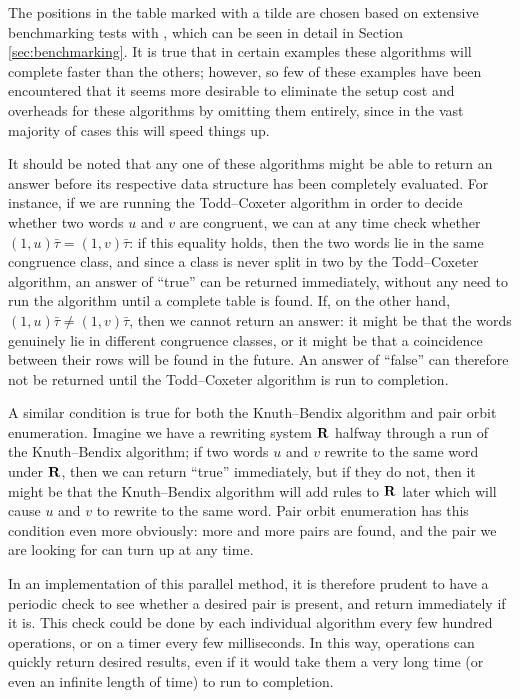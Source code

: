 The positions in the table marked with a tilde are chosen based on extensive
benchmarking tests with \libsemigroups{}, which can be seen in detail in
Section \ref{sec:benchmarking}.  It is true that in certain examples these
algorithms will complete faster than the others; however, so few of these
examples have been encountered that it seems more desirable to eliminate the
setup cost and overheads for these algorithms by omitting them entirely, since
in the vast majority of cases this will speed things up.

It should be noted that any one of these algorithms might be able to return an
answer before its respective data structure has been completely evaluated.  For
instance, if we are running the Todd--Coxeter algorithm in order to decide whether two words
$u$ and $v$ are congruent, we can at any time check whether
$(1,u)\bar\tau = (1,v)\bar\tau$: if this equality holds, then the two words lie
in the same congruence class, and since a class is never split in two by the
Todd--Coxeter algorithm, an answer of ``true'' can be returned immediately,
without any need to run the algorithm until a complete table is found.  If, on
the other hand, $(1,u)\bar\tau \neq (1,v)\bar\tau$, then we cannot return an
answer: it might be that the words genuinely lie in different congruence
classes, or it might be that a coincidence between their rows will be found in
the future.  An answer of ``false'' can therefore not be returned until
the Todd--Coxeter algorithm is run to completion.

A similar condition is true for both the Knuth--Bendix algorithm and pair orbit enumeration.
Imagine we have a rewriting system $\mathbf{R}$ halfway through a run of the Knuth--Bendix algorithm;
if two words $u$ and $v$ rewrite to the same word under $\mathbf{R}$, then we can
return ``true'' immediately, but if they do not, then it might be that
the Knuth--Bendix algorithm will add rules to $\mathbf{R}$ later which will cause $u$ and $v$ to
rewrite to the same word.  Pair orbit enumeration has this condition even more
obviously: more and more pairs are found, and the pair we are looking for can
turn up at any time.

In an implementation of this parallel method, it is therefore prudent to
have a periodic check to see whether a desired pair is present, and return
immediately if it is.  This check could be done by each individual algorithm
every few hundred operations, or on a timer every few milliseconds.  In this
way, operations can quickly return desired results, even if it would take them a
very long time (or even an infinite length of time) to run to completion.

